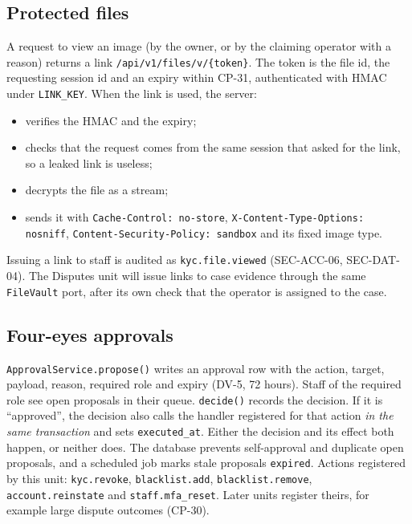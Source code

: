 \documentclass[11pt,a4paper]{article}
\begin{document}
\subsection{Protected files}
\label{sec:files}
A request to view an image (by the owner, or by the claiming operator with a reason) returns a link \texttt{/api/v1/files/v/\{token\}}. The token is the file id, the requesting session id and an expiry within CP-31, authenticated with HMAC under \texttt{LINK\_KEY}. When the link is used, the server:
\begin{itemize}[nosep]
  \item verifies the HMAC and the expiry;
  \item checks that the request comes from the same session that asked for the link, so a leaked link is useless;
  \item decrypts the file as a stream;
  \item sends it with \texttt{Cache-Control: no-store}, \texttt{X-Content-Type-Options: nosniff}, \texttt{Content-Security-Policy: sandbox} and its fixed image type.
\end{itemize}
Issuing a link to staff is audited as \texttt{kyc.file.viewed} (SEC-ACC-06, SEC-DAT-04). The Disputes unit will issue links to case evidence through the same \texttt{FileVault} port, after its own check that the operator is assigned to the case.

\subsection{Four-eyes approvals}
\label{sec:flow-approvals}
\texttt{ApprovalService.propose()} writes an approval row with the action, target, payload, reason, required role and expiry (DV-5, 72 hours). Staff of the required role see open proposals in their queue. \texttt{decide()} records the decision. If it is ``approved'', the decision also calls the handler registered for that action \emph{in the same transaction} and sets \texttt{executed\_at}. Either the decision and its effect both happen, or neither does. The database prevents self-approval and duplicate open proposals, and a scheduled job marks stale proposals \texttt{expired}. Actions registered by this unit: \texttt{kyc.revoke}, \texttt{blacklist.add}, \texttt{blacklist.remove}, \texttt{account.reinstate} and \texttt{staff.mfa\_reset}. Later units register theirs, for example large dispute outcomes (CP-30).
\end{document}

